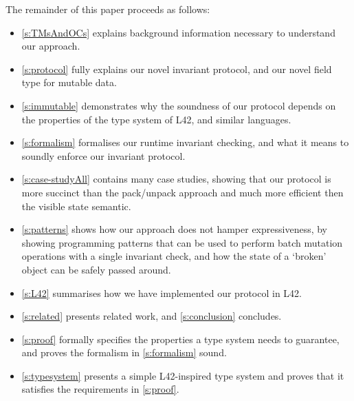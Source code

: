 The remainder of this paper proceeds as follows:
\begin{itemize}
	\item \autoref{s:TMsAndOCs} explains background information necessary to understand our approach.
	\item \autoref{s:protocol} fully explains our novel invariant protocol, and our novel field type for mutable data.
	\item \autoref{s:immutable} demonstrates why the soundness of our protocol depends on the properties of the type system of L42, and similar languages.
	\item \autoref{s:formalism} formalises our runtime invariant checking, and what it means to soundly enforce our invariant protocol.
	\item \autoref{s:case-studyAll} contains many case studies, showing that our protocol is more succinct than the pack/unpack approach and much more efficient then the visible state semantic.
	\item \autoref{s:patterns} shows how our approach does not hamper expressiveness, by showing programming patterns that can be used to perform batch mutation operations with a single invariant check, and how the state of a `broken' object can be safely passed around.
	\item \autoref{s:L42} summarises how we have implemented our protocol in L42.
	\item \autoref{s:related} presents related work, and \autoref{s:conclusion} concludes.
	\item \autoref{s:proof} formally specifies the properties a type system needs to guarantee, and proves the formalism in \autoref{s:formalism} sound.
	\item \autoref{s:typesystem} presents a simple L42-inspired type system and proves that it satisfies the requirements in \autoref{s:proof}.
\end{itemize}




